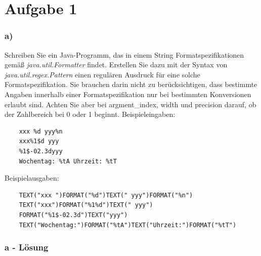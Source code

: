 \chapter{Aufgabe 1}
\label{sec:aufgabe1}

\subsection*{a)}
Schreiben Sie ein Java-Programm, das in einem String Formatspezifikationen gemäß
\textit{java.util.Formatter}
findet. \newline
Erstellen Sie dazu mit der Syntax von
\textit{java.util.regex.Pattern}
einen regulären Ausdruck für eine solche Formatspezifikation. \newline
Sie brauchen darin nicht zu berücksichtigen, dass bestimmte Angaben innerhalb einer Formatspezifikation
nur bei bestimmten Konversionen erlaubt sind.
Achten Sie aber bei argment\_index, width und precision darauf, ob der Zahlbereich bei 0 oder 1 beginnt. \newline
\newline
Beispieleingaben: \newline
\begin{verbatim}
	xxx %d yyy%n
	xxx%1$d yyy
	%1$-02.3dyyy
	Wochentag: %tA Uhrzeit: %tT
\end{verbatim}
	\newline
Beispielausgaben: \newline
\begin{verbatim}
	TEXT("xxx ")FORMAT("%d")TEXT(" yyy")FORMAT("%n")
	TEXT("xxx")FORMAT("%1%d")TEXT(" yyy")
	FORMAT("%1$-02.3d")TEXT("yyy")
	TEXT("Wochentag:")FORMAT("%tA")TEXT("Uhrzeit:")FORMAT("%tT")
\end{verbatim}

\newline

\newpage
\subsection*{a - Lösung}


